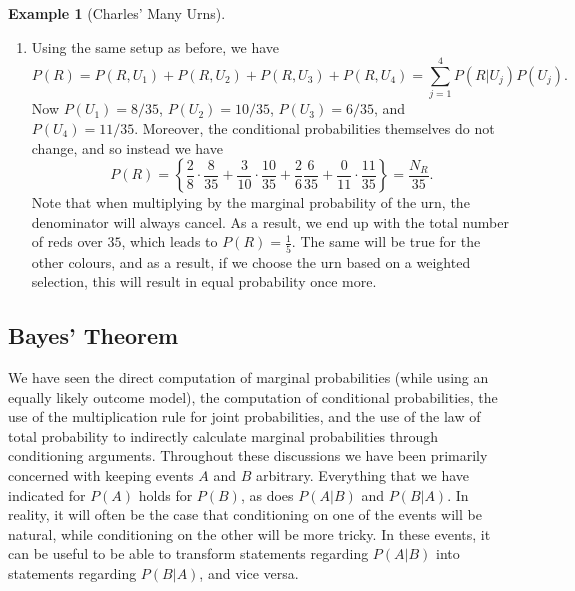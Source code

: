 \documentclass[
  letterpaper,
  DIV=11,
  numbers=noendperiod]{scrreprt}
\theoremstyle{definition}
\theoremstyle{definition}
\newtheorem{example}{Example}[chapter]
\theoremstyle{definition}
\theoremstyle{remark}
\begin{document}
\begin{example}[Charles' Many
Urns]
\begin{tcolorbox}[enhanced jigsaw, colback=white, colframe=quarto-callout-color-frame, arc=.35mm, leftrule=.75mm, rightrule=.15mm, opacityback=0, breakable, bottomrule=.15mm, left=2mm, toprule=.15mm]
\begin{enumerate}
  Note that these probabilities sum to \(1\). In decimal these simplify
  to approximately 0.221, 0.168, 0.2, 0.206, 0.206.
\item
  Using the same setup as before, we have
  \[P(R) = P(R, U_1) + P(R, U_2) + P(R, U_3) + P(R, U_4) = \sum_{j=1}^4 P(R|U_j)P(U_j).\]
  Now \(P(U_1) = 8/35\), \(P(U_2) = 10/35\), \(P(U_3) = 6/35\), and
  \(P(U_4) = 11/35\). Moreover, the conditional probabilities themselves
  do not change, and so instead we have
  \[P(R) = \left\{\frac{2}{8}\cdot\frac{8}{35} + \frac{3}{10}\cdot\frac{10}{35} + \frac{2}{6}\frac{6}{35} + \frac{0}{11}\cdot\frac{11}{35}\right\} = \frac{N_R}{35}.\]
  Note that when multiplying by the marginal probability of the urn, the
  denominator will always cancel. As a result, we end up with the total
  number of reds over \(35\), which leads to \(P(R) = \frac{1}{5}\). The
  same will be true for the other colours, and as a result, if we choose
  the urn based on a weighted selection, this will result in equal
  probability once more.
\end{enumerate}

\end{tcolorbox}

\end{example}

\subsection{Bayes' Theorem}\label{bayes-theorem}

We have seen the direct computation of marginal probabilities (while
using an equally likely outcome model), the computation of conditional
probabilities, the use of the multiplication rule for joint
probabilities, and the use of the law of total probability to indirectly
calculate marginal probabilities through conditioning arguments.
Throughout these discussions we have been primarily concerned with
keeping events \(A\) and \(B\) arbitrary. Everything that we have
indicated for \(P(A)\) holds for \(P(B)\), as does \(P(A|B)\) and
\(P(B|A)\). In reality, it will often be the case that conditioning on
one of the events will be natural, while conditioning on the other will
be more tricky. In these events, it can be useful to be able to
transform statements regarding \(P(A|B)\) into statements regarding
\(P(B|A)\), and vice versa.
\end{document}
